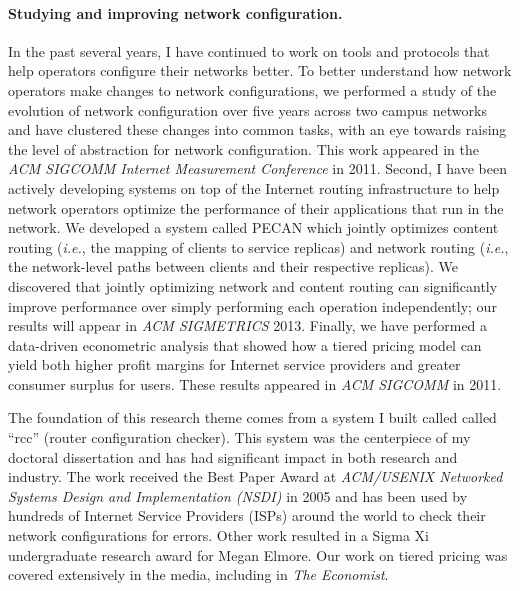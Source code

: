 \documentclass{article}
\newcommand{\ie}{{\em i.e.}}
\newcommand{\eg}{{\em e.g.}}
\begin{document}

\paragraph{Studying and improving network configuration.}
In the past several years, I have continued to work on tools and
protocols that help operators configure their networks better.  To
better understand how network operators make changes to network
configurations, we performed a study of the evolution of network
configuration over five years across two campus networks and have
clustered these changes into common tasks, with an eye towards raising
the level of abstraction for network configuration.  This work appeared
in the {\em ACM SIGCOMM Internet Measurement Conference} in 2011.
Second, I have been actively developing systems on top of the Internet
routing infrastructure to help network operators optimize the
performance of their applications that run in the network.  We developed
a system called PECAN which jointly optimizes content routing (\ie, the
mapping of clients to service replicas) and network routing (\ie, the
network-level paths between clients and their respective replicas).  We
discovered that jointly optimizing network and content routing can
significantly improve performance over simply performing each operation
independently; our results will appear in {\em ACM SIGMETRICS} 2013.
Finally, we have performed a data-driven econometric analysis that
showed how a tiered pricing model can yield both higher profit margins
for Internet service providers and greater consumer surplus for users.
These results appeared in {\em ACM SIGCOMM} in 2011.

The foundation of this research theme comes from a system I built called
called ``rcc'' (router configuration checker).  This system was the
centerpiece of my doctoral dissertation and has had significant impact
in both research and industry.  The work received the Best Paper Award
at {\em ACM/USENIX Networked Systems Design and Implementation (NSDI)}
in 2005 and has been used by hundreds of Internet Service Providers
(ISPs) around the world to check their network configurations for
errors.  Other work resulted in a Sigma Xi undergraduate research award
for Megan Elmore.  Our work on tiered pricing was covered extensively in
the media, including in {\em The Economist}.



\label{lastpage}
\end{document}
